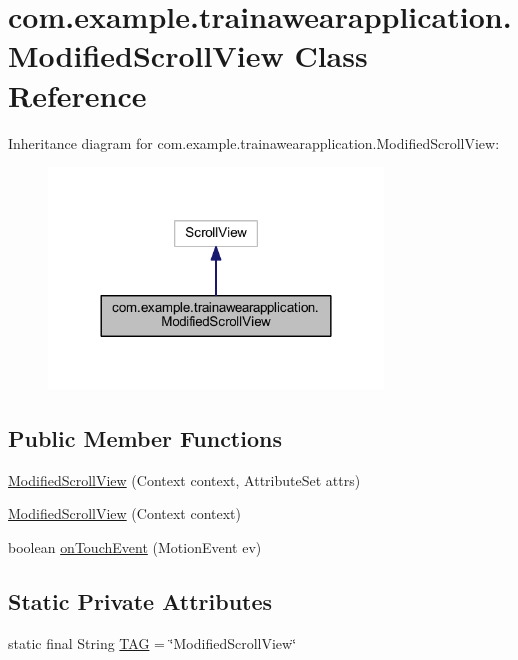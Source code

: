 \hypertarget{classcom_1_1example_1_1trainawearapplication_1_1_modified_scroll_view}{}\section{com.\+example.\+trainawearapplication.\+Modified\+Scroll\+View Class Reference}
\label{classcom_1_1example_1_1trainawearapplication_1_1_modified_scroll_view}


Inheritance diagram for com.\+example.\+trainawearapplication.\+Modified\+Scroll\+View\+:
\nopagebreak
\begin{figure}[H]
\begin{center}
\leavevmode
\includegraphics[width=252pt]{classcom_1_1example_1_1trainawearapplication_1_1_modified_scroll_view__inherit__graph}
\end{center}
\end{figure}
\subsection*{Public Member Functions}
\begin{DoxyCompactItemize}
\item 
\mbox{\hyperlink{classcom_1_1example_1_1trainawearapplication_1_1_modified_scroll_view_a54164bcc307ead282e4a872882790ba1}{Modified\+Scroll\+View}} (Context context, Attribute\+Set attrs)
\item 
\mbox{\hyperlink{classcom_1_1example_1_1trainawearapplication_1_1_modified_scroll_view_a60a3e71da3963714f6ec401034a80c6f}{Modified\+Scroll\+View}} (Context context)
\item 
boolean \mbox{\hyperlink{classcom_1_1example_1_1trainawearapplication_1_1_modified_scroll_view_a1183afa31872d9cddf72b967d2db4f12}{on\+Touch\+Event}} (Motion\+Event ev)
\end{DoxyCompactItemize}
\subsection*{Static Private Attributes}
\begin{DoxyCompactItemize}
\item 
static final String \mbox{\hyperlink{classcom_1_1example_1_1trainawearapplication_1_1_modified_scroll_view_aa8c3ba8f3bb238ac0f2d56e82757814a}{T\+AG}} = \char`\"{}Modified\+Scroll\+View\char`\"{}
\end{DoxyCompactItemize}


